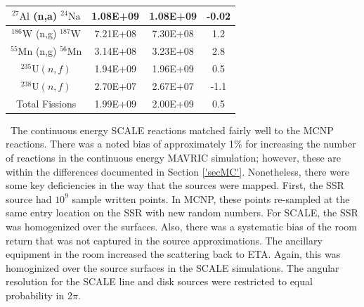 \begin{table}[htb!]
\begin{tabular}{|c|c|c|c|}
$\mathrm{^{27}Al}$ (n,a) $\mathrm{^{24}Na}$ & 1.08E+09 & 1.08E+09 & -0.02 \\ \hline
$\mathrm{^{186}W}$ (n,g) $\mathrm{^{187}W}$ & 7.21E+08 & 7.30E+08 & 1.2 \\ \hline
$\mathrm{^{55}Mn}$ (n,g) $\mathrm{^{56}Mn}$ & 3.14E+08 & 3.23E+08 & 2.8 \\ \hline
$\mathrm{^{235}U} (n,f)$ & 1.94E+09 & 1.96E+09 & 0.5 \\ \hline
$\mathrm{^{238}U} (n,f)$ & 2.70E+07 & 2.67E+07 & -1.1 \\ \hline
Total Fissions & 1.99E+09 & 2.00E+09 & 0.5 \\ \hline
	\end{tabular}
\end{table}

\ The continuous energy SCALE reactions matched fairly well to the MCNP reactions. 
There was a noted bias of approximately 1\% for increasing the number of reactions in the continuous energy MAVRIC simulation; however, these are within the differences documented in Section \ref{'secMC'}. 
Nonetheless, there were some key deficiencies in the way that the sources were mapped. 
First, the SSR source had $10^{9}$ sample written points. 
In MCNP, these points re-sampled at the same entry location on the SSR with new random numbers. 
For SCALE, the SSR was homogenized over the surfaces. 
Also, there was a systematic bias of the room return that was not captured in the source approximations. 
The ancillary equipment in the room increased the scattering back to ETA. 
Again, this was homoginized over the source surfaces in the SCALE simulations. 
The angular resolution for the SCALE line and disk sources were restricted to equal probability in 2$\pi$. 

